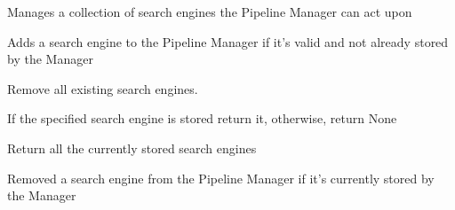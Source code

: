 \documentclass[letterpaper,10pt,english]{sphinxmanual}
\begin{document}
\begin{fulllineitems}
\label{api3.0:puppy.pipeline.SearchEngineManager}
Manages a collection of search engines the Pipeline Manager can act upon

\begin{fulllineitems}
\label{api3.0:puppy.pipeline.SearchEngineManager.add_search_engine}
Adds a search engine to the Pipeline Manager if it's valid and not already stored by the Manager

\end{fulllineitems}


\begin{fulllineitems}
\label{api3.0:puppy.pipeline.SearchEngineManager.clear_search_engines}
Remove all existing search engines.

\end{fulllineitems}


\begin{fulllineitems}
\label{api3.0:puppy.pipeline.SearchEngineManager.get_search_engine}
If the specified search engine is stored return it, otherwise, return None

\end{fulllineitems}


\begin{fulllineitems}
\label{api3.0:puppy.pipeline.SearchEngineManager.get_search_engines}
Return all the currently stored search engines

\end{fulllineitems}


\begin{fulllineitems}
\label{api3.0:puppy.pipeline.SearchEngineManager.remove_search_engine}
Removed a search engine from the Pipeline Manager if it's currently stored by the Manager

\end{fulllineitems}


\end{fulllineitems}
\end{document}

